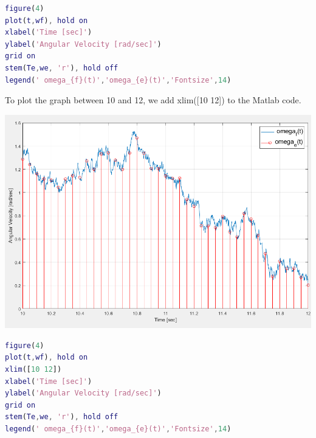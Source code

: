 \documentclass[a4paper,12pt]{article}
\begin{document}
\begin{enumerate}[label={\color{blue}\arabic*)}]
\begin{multicols}{2}
        \columnbreak

        \begin{lstlisting}[style=Matlab-editor,language=Matlab, basicstyle=\small\ttfamily]
figure(4)
plot(t,wf), hold on
xlabel('Time [sec]')
ylabel('Angular Velocity [rad/sec]')
grid on
stem(Te,we, 'r'), hold off
legend(' omega_{f}(t)','omega_{e}(t)','Fontsize',14)
        \end{lstlisting}
    \end{multicols}

    \newpage

    To plot the graph between 10 and 12, we add xlim([10 12]) to the Matlab code.
    \begin{multicols}{2}
        \begin{flushleft}
            \includegraphics[width=0.75\linewidth]{Images/Wf_and_We_Zoomed.png}
            \label{Figure7}
        \end{flushleft}

        \columnbreak

        \begin{lstlisting}[style=Matlab-editor,language=Matlab, basicstyle=\small\ttfamily]
figure(4)
plot(t,wf), hold on
xlim([10 12])
xlabel('Time [sec]')
ylabel('Angular Velocity [rad/sec]')
grid on
stem(Te,we, 'r'), hold off
legend(' omega_{f}(t)','omega_{e}(t)','Fontsize',14)
        \end{lstlisting}
    \end{multicols}


\end{enumerate}
\end{document}
